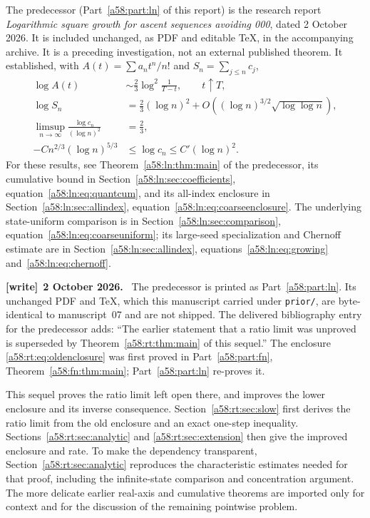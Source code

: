 \documentclass[11pt,letterpaper]{article}
\newcommand{\file}[1]{\nolinkurl{#1}}
\theoremstyle{remark}
\newenvironment{writenote}[1][]{\par\smallskip\begingroup\small
 \noindent\textbf{[write]}\if\relax\detokenize{#1}\relax\else~\textbf{#1.}\fi\ }%
 {\par\endgroup\smallskip}
\begin{document}
The predecessor (Part~\ref{a58:part:ln} of this report) is the research report
\emph{Logarithmic square growth for ascent sequences avoiding 000},
dated 2 October 2026. It is included unchanged, as PDF and editable TeX,
in the accompanying archive. It is a preceding investigation, not an
external published theorem. It established, with
$A(t)=\sum a_nt^n/n!$ and $S_n=\sum_{j\le n}c_j$,
\begin{align}
 \log A(t)&\sim\frac23\log^2\frac1{T-t},\qquad t\uparrow T,
 \label{a58:rt:eq:importedreal}\\
 \log S_n&=\frac23(\log n)^2
       +O\!\left((\log n)^{3/2}\sqrt{\log\log n}\right),
 \label{a58:rt:eq:importedcum}\\
 \limsup_{n\to\infty}\frac{\log c_n}{(\log n)^2}&=\frac23,
 \label{a58:rt:eq:importedlimsup}\\
 -C n^{2/3}(\log n)^{5/3}&\le\log c_n\le C'(\log n)^2.
 \label{a58:rt:eq:oldenclosure}
\end{align}
For these results, see Theorem~\ref{a58:ln:thm:main} of the predecessor, its cumulative
bound in Section~\ref{a58:ln:sec:coefficients}, equation~\eqref{a58:ln:eq:quantcum}, and its all-index
enclosure in Section~\ref{a58:ln:sec:allindex}, equation~\eqref{a58:ln:eq:coarseenclosure}.
The underlying state-uniform comparison is
in Section~\ref{a58:ln:sec:comparison}, equation~\eqref{a58:ln:eq:coarseuniform}; its large-seed specialization
and Chernoff estimate are in Section~\ref{a58:ln:sec:allindex},
equations~\eqref{a58:ln:eq:growing} and~\eqref{a58:ln:eq:chernoff}.
\begin{writenote}[2 October 2026]
The predecessor is printed as Part~\ref{a58:part:ln}. Its unchanged PDF and TeX, which this manuscript carried under \file{prior/}, are byte-identical to manuscript~07 and are not shipped. The delivered bibliography entry for the predecessor adds: ``The earlier statement that a ratio limit was unproved is superseded by Theorem~\ref{a58:rt:thm:main} of this sequel.'' The enclosure \eqref{a58:rt:eq:oldenclosure} was first proved in Part~\ref{a58:part:fn}, Theorem~\ref{a58:fn:thm:main}; Part~\ref{a58:part:ln} re-proves it.
\end{writenote}

This sequel proves the ratio limit left open there, and improves the
lower enclosure and its inverse consequence. Section~\ref{a58:rt:sec:slow}
first derives the ratio limit from the old enclosure and an exact
one-step inequality. Sections~\ref{a58:rt:sec:analytic} and \ref{a58:rt:sec:extension}
then give the improved enclosure and rate. To make the dependency
transparent, Section~\ref{a58:rt:sec:analytic} reproduces the characteristic
estimates needed for that proof, including the infinite-state comparison
and concentration argument. The more delicate earlier real-axis and
cumulative theorems are imported only for context and for the discussion
of the remaining pointwise problem.
\end{document}
